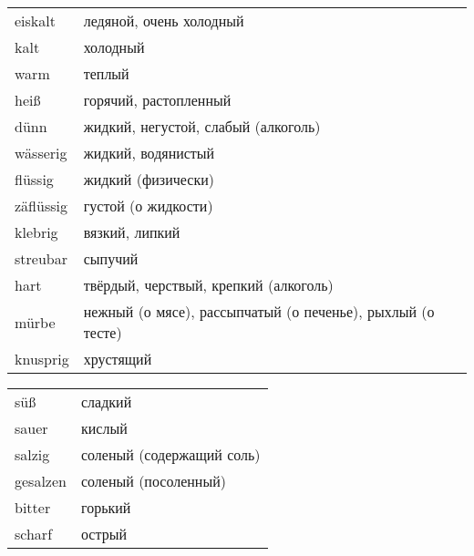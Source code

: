 
 \\
 \\
 \\
 \\


\begin{longtable}{|l|l|}
\hline\endhead
\hline\endfoot
eiskalt & ледяной, очень холодный \\
kalt & холодный \\
warm & теплый \\
hei\ss & горячий, растопленный \\
\hline
d\"unn & жидкий, негустой, слабый (алкоголь) \\
w\"asserig & жидкий, водянистый \\
fl\"ussig & жидкий (физически) \\
z\"afl\"ussig & густой (о жидкости) \\
klebrig & вязкий, липкий \\
streubar & сыпучий \\
hart & твёрдый, черствый, крепкий (алкоголь) \\
m\"urbe & нежный (о мясе), рассыпчатый (о печенье), рыхлый (о тесте) \\
knusprig & хрустящий
\end{longtable}



\begin{longtable}{|l|l|}
\hline\endhead
\hline\endfoot
s\"u\ss & сладкий \\
sauer & кислый \\
salzig & соленый (содержащий соль) \\
gesalzen & соленый (посоленный) \\
bitter & горький \\
scharf & острый
\end{longtable}

